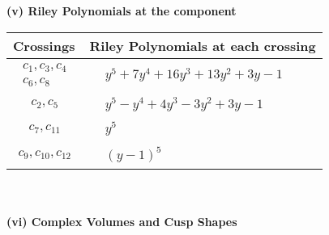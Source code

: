 \documentclass[1p]{elsarticle_modified}
\theoremstyle{definition}
\begin{document}
\newpage\renewcommand{\arraystretch}{1}
\flushleft \textbf{(v) Riley Polynomials at the component}\newline \\
\begin{tabular}{m{50pt}|m{274pt}}
Crossings & \hspace{64pt}Riley Polynomials at each crossing \\
\hline $$\begin{aligned}c_{1},c_{3},c_{4}\\c_{6},c_{8}\end{aligned}$$&$\begin{aligned}
&y^5+7 y^4+16 y^3+13 y^2+3 y-1
\end{aligned}$\\
\hline $$\begin{aligned}c_{2},c_{5}\end{aligned}$$&$\begin{aligned}
&y^5- y^4+4 y^3-3 y^2+3 y-1
\end{aligned}$\\
\hline $$\begin{aligned}c_{7},c_{11}\end{aligned}$$&$\begin{aligned}
&y^5
\end{aligned}$\\
\hline $$\begin{aligned}c_{9},c_{10},c_{12}\end{aligned}$$&$\begin{aligned}
&(y-1)^5
\end{aligned}$\\
\hline
\end{tabular}\\~\\
\newpage\flushleft \textbf{(vi) Complex Volumes and Cusp Shapes}
\end{document}
